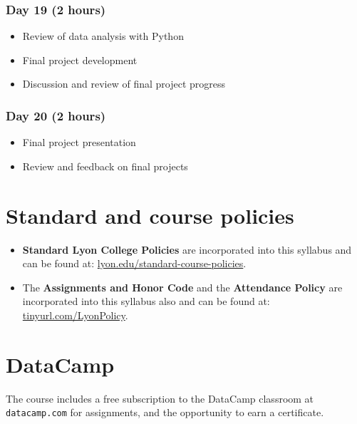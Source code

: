 \documentclass[11pt]{article}
\begin{document}
\subsubsection*{Day 19 (2 hours)}
\label{sec:orged9c812}

\begin{itemize}
\item Review of data analysis with Python
\item Final project development
\item Discussion and review of final project progress
\end{itemize}
\subsubsection*{Day 20 (2 hours)}
\label{sec:orgaef5643}

\begin{itemize}
\item Final project presentation
\item Review and feedback on final projects
\end{itemize}

\section*{Standard and course policies}
\label{sec:org46e8057}

\begin{itemize}
\item \textbf{Standard Lyon College Policies} are incorporated into this syllabus
and can be found at: \href{http://www.lyon.edu/standard-course-policies}{lyon.edu/standard-course-policies}.

\item The \textbf{Assignments and Honor Code} and the \textbf{Attendance Policy} are
incorporated into this syllabus also and can be found at:
\href{https://tinyurl.com/LyonPolicy}{tinyurl.com/LyonPolicy}.
\end{itemize}

\section*{DataCamp}
\label{sec:orgdf4c87e}

The course includes a free subscription to the DataCamp classroom at
\texttt{datacamp.com} for assignments, and the opportunity to earn a
certificate.
\end{document}
